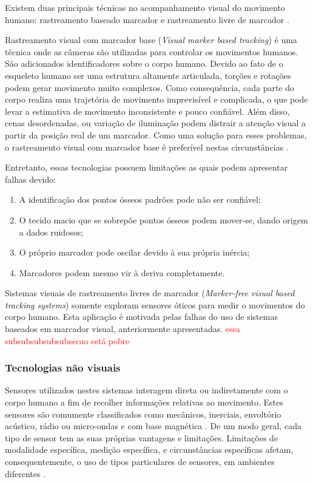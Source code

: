 Existem duas principais técnicas no acompanhamento visual do movimento humano: rastreamento baseado marcador e rastreamento livre de marcador \cite{YTao2010}.

Rastreamento visual com marcador base (\textit{Visual marker based tracking}) é uma técnica onde as câmeras são utilizadas para controlar os movimentos humanos. São adicionados identificadores sobre o corpo humano. Devido ao fato de o esqueleto humano ser uma estrutura altamente articulada, torções e rotações podem gerar movimento muito complexos. Como consequência, cada parte do corpo realiza uma trajetória de movimento imprevisível e complicada, o que pode levar a estimativa de movimento inconsistente e pouco confiável. Além disso, cenas desordenadas, ou variação de iluminação podem distrair a atenção visual a partir da posição real de um marcador. Como uma solução para esses problemas, o rastreamento visual com marcador base é preferível nestas circunstâncias \cite{zhang2002visual}.

Entretanto, essas tecnologias possuem limitações as quais podem apresentar falhas devido:

\begin{enumerate}
    \item A identificação dos pontos ósseos padrões pode não ser confiável; 
    \item O tecido macio que se sobrepõe pontos ósseos podem mover-se, dando origem a dados ruidosos; 
    \item O próprio marcador pode oscilar devido à sua própria inércia; 
    \item Marcadores podem mesmo vir à deriva completamente.
\end{enumerate}

Sistemas visuais de rastreamento livres de marcador (\textit{Marker-free visual based tracking systems}) somente exploram sensores óticos para medir o movimentos do corpo humano. Esta aplicação é motivada pelas falhas do uso de sistemas baseados em marcador visual, anteriormente apresentadas. 
 \textcolor{red}{essa subsubsubsubsubsecao está pobre}



\subsubsection{Tecnologias não visuais}\label{sec:tec-vis}
Sensores utilizados nestes sistemas interagem direta ou indiretamente com o corpo humano a fim de recolher informações relativas ao movimento. Estes sensores são comumente classificados como mecânicos, inerciais, envoltório acústico, rádio ou micro-ondas e com base magnética \cite{zhou2008human}. De um modo geral, cada tipo de sensor tem as suas próprias vantagens e limitações. Limitações de modalidade específica, medição específica, e circunstâncias específicas afetam, consequentemente, o uso de tipos particulares de sensores, em ambientes diferentes \cite{Welch:2002}.

